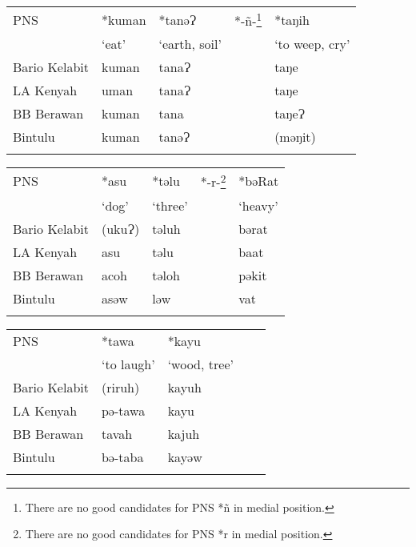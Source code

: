 \documentclass[output=paper]{langscibook}
\begin{document}
\begin{paperappendix}
\begin{tabularx}{\textwidth}{lXXXl}
\lsptoprule
PNS              & *kuman  &*tanəɁ        &   *-ñ-\footnote{There are no good candidates for PNS *ñ in medial position.} &   *taŋih  \\
                 &  ‘eat’    &‘earth, soil’   &&    ‘to weep, cry’                                                                         \\
\midrule
Bario Kelabit    &  kuman  &  tanaɁ       &&  taŋe                                                                                   \\
LA Kenyah        &  uman   & tanaɁ        && taŋe                                                                                    \\
BB Berawan       &  kuman  &  tana        && taŋeɁ                                                                                   \\
Bintulu          &  kuman  &  tanəɁ       &&  (məŋit)\\
\lspbottomrule
\end{tabularx}

\begin{tabularx}{\textwidth}{lXXXl}
\lsptoprule
PNS              &   *asu  &  *təlu   & *-r-\footnote{There are no good candidates for PNS *r in medial position.}  &  *bəRat    \\
                 &   ‘dog’   &   ‘three’  &&      ‘heavy’                                                                              \\
\midrule
Bario Kelabit    &   (ukuɁ)&    təluh &&      bərat                                                                             \\
LA Kenyah        &   asu   & təlu     &&  baat                                                                                  \\
BB Berawan       &  acoh   & təloh    &&   pəkit                                                                                \\
Bintulu          &  asəw   & ləw      && vat\\
\lspbottomrule
\end{tabularx}

\begin{tabularx}{\textwidth}{lXXXl}
\lsptoprule
PNS              &  *tawa  & *kayu         \\
                 & ‘to laugh’& ‘wood, tree’    \\
\midrule
Bario Kelabit    & (riruh) &  kayuh        \\
LA Kenyah        &  pə-tawa& kayu          \\
BB Berawan       &  tavah  & kajuh         \\
Bintulu          &bə-taba  & kayəw         \\
\lspbottomrule
\end{tabularx}
\end{paperappendix}

\printbibliography[heading=subbibliography,notkeyword=this]
\end{document}
